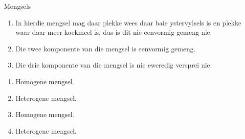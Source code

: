 \begin{wex}{Mengsels}
{\begin{enumerate}[noitemsep, label=\textbf{\alph*}. ]
\item In hierdie mengsel mag daar plekke wees daar baie ystervylsels is en plekke waar daar meer koekmeel is, dus is dit nie eenvormig gemeng nie.
\item Die twee komponente van die mengsel is eenvormig gemeng.
\item Die drie komponente van die mengsel is nie eweredig versprei nie.\end{enumerate}
\begin{enumerate}[noitemsep, label=\textbf{\alph*}. ] 
\item Homogene mengsel.
\item Heterogene mengsel.
\item Homogene mengsel.
\item Heterogene mengsel.\end{enumerate}}
    \end{wex}
 
